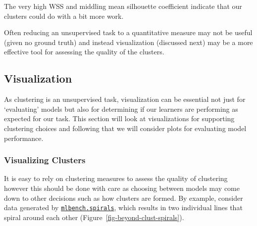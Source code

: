 The very high WSS and middling mean silhouette coefficient indicate that
our clusters could do with a bit more work.

Often reducing an unsupervised task to a quantitative measure may not be
useful (given no ground truth) and instead visualization (discussed
next) may be a more effective tool for assessing the quality of the
clusters.

\hypertarget{visualization}{%
\subsection{Visualization}\label{visualization}}

As clustering is an unsupervised task, visualization can be essential
not just for `evaluating' models but also for determining if our
learners are performing as expected for our task. This section will look
at visualizations for supporting clustering choices and following that
we will consider plots for evaluating model performance.

\hypertarget{visualizing-clusters}{%
\subsubsection{Visualizing Clusters}\label{visualizing-clusters}}

It is easy to rely on clustering measures to assess the quality of
clustering however this should be done with care as choosing between
models may come down to other decisions such as how clusters are formed.
By example, consider data generated by
\href{https://www.rdocumentation.org/packages/mlbench/topics/mlbench.spirals}{\texttt{mlbench.spirals}},
which results in two individual lines that spiral around each other
(Figure~\ref{fig-beyond-clust-spirals}).

\begin{Shaded}
\begin{Highlighting}[]
\OtherTok{=}\SpecialCharTok{::}\NormalTok{(} \NormalTok{, } \NormalTok{)}
\OtherTok{=} \NormalTok{(}\SpecialCharTok{$}
\end{Highlighting}
\end{Shaded}

